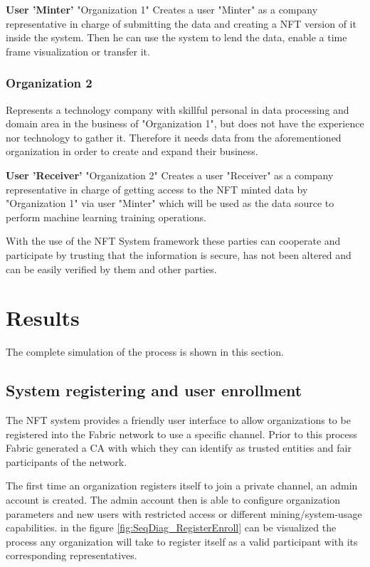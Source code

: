 \documentclass[a4paper]{article}
\begin{document}
\textbf{User 'Minter'}
"Organization 1" Creates a user "Minter" as a company representative in charge of submitting the data and creating a NFT version of it inside the system. Then he can use the system to lend the data, enable a time frame visualization or transfer it.

\subsubsection{Organization 2}
Represents a technology company with skillful personal in data processing and domain area in the business of "Organization 1", but does not have the experience nor technology to gather it. Therefore it needs data from the aforementioned organization in order to create and expand their business.

\textbf{User 'Receiver'}
"Organization 2" Creates a user "Receiver"  as a company representative in charge of getting access to the NFT minted data by "Organization 1" via user "Minter" which will be used as the data source to perform machine learning training operations. 

With the use of the NFT System framework these parties can cooperate and participate by trusting that the information is secure, has not been altered and can be easily verified by them and other parties.

\section{Results}
The complete simulation of the process is shown in this section.

\subsection{System registering and user enrollment}
The NFT system provides a friendly user interface to allow organizations to be registered into the Fabric network to use a specific channel. 
Prior to this process Fabric generated a CA with which they can identify as trusted entities and fair participants of the network.

The first time an organization registers itself to join a private channel, an admin account is created. The admin account then is able to configure organization parameters and new users with restricted access or different mining/system-usage capabilities.
in the figure \ref{fig:SeqDiag_RegisterEnroll} can be visualized the process any organization will take to register itself as a valid participant with its corresponding representatives.
\end{document}

